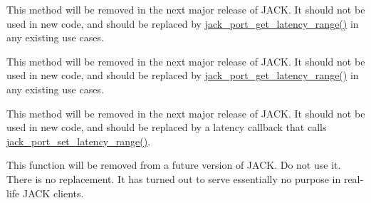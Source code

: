 \begin{DoxyRefList}
\item[\label{da/d58/deprecated__deprecated000009}%
\hypertarget{da/d58/deprecated__deprecated000009}{}%
\-Global \hyperlink{group__LatencyFunctions_ga47fa957309f9b3111010284e10cc1de0}{jack\-\_\-port\-\_\-get\-\_\-latency} (jack\-\_\-port\-\_\-t $\ast$port) \-J\-A\-C\-K\-\_\-\-O\-P\-T\-I\-O\-N\-A\-L\-\_\-\-W\-E\-A\-K\-\_\-\-D\-E\-P\-R\-E\-C\-A\-T\-E\-D\-\_\-\-E\-X\-P\-O\-R\-T]\-This method will be removed in the next major release of \-J\-A\-C\-K. \-It should not be used in new code, and should be replaced by \hyperlink{group__LatencyFunctions_gaf379bc0e88a6df6c4b7836db4b9382d7}{jack\-\_\-port\-\_\-get\-\_\-latency\-\_\-range()} in any existing use cases.  
\item[\label{da/d58/deprecated__deprecated000010}%
\hypertarget{da/d58/deprecated__deprecated000010}{}%
\-Global \hyperlink{group__LatencyFunctions_ga7f5835f17cb55a5ed64bb63cb18c462c}{jack\-\_\-port\-\_\-get\-\_\-total\-\_\-latency} (jack\-\_\-client\-\_\-t $\ast$, jack\-\_\-port\-\_\-t $\ast$port) \-J\-A\-C\-K\-\_\-\-O\-P\-T\-I\-O\-N\-A\-L\-\_\-\-W\-E\-A\-K\-\_\-\-D\-E\-P\-R\-E\-C\-A\-T\-E\-D\-\_\-\-E\-X\-P\-O\-R\-T]\-This method will be removed in the next major release of \-J\-A\-C\-K. \-It should not be used in new code, and should be replaced by \hyperlink{group__LatencyFunctions_gaf379bc0e88a6df6c4b7836db4b9382d7}{jack\-\_\-port\-\_\-get\-\_\-latency\-\_\-range()} in any existing use cases.  
\item[\label{da/d58/deprecated__deprecated000008}%
\hypertarget{da/d58/deprecated__deprecated000008}{}%
\-Global \hyperlink{group__LatencyFunctions_gaba121996f00bd96ceec5b1c1012fc767}{jack\-\_\-port\-\_\-set\-\_\-latency} (jack\-\_\-port\-\_\-t $\ast$, jack\-\_\-nframes\-\_\-t) \-J\-A\-C\-K\-\_\-\-O\-P\-T\-I\-O\-N\-A\-L\-\_\-\-W\-E\-A\-K\-\_\-\-D\-E\-P\-R\-E\-C\-A\-T\-E\-D\-\_\-\-E\-X\-P\-O\-R\-T]\-This method will be removed in the next major release of \-J\-A\-C\-K. \-It should not be used in new code, and should be replaced by a latency callback that calls \hyperlink{group__LatencyFunctions_ga7a8f181fcec32945db7b8e06ee1ca94b}{jack\-\_\-port\-\_\-set\-\_\-latency\-\_\-range()}.  
\item[\label{da/d58/deprecated__deprecated000006}%
\hypertarget{da/d58/deprecated__deprecated000006}{}%
\-Global \hyperlink{group__PortFunctions_ga14afcad849c17bcd6cb739d14899cecf}{jack\-\_\-port\-\_\-tie} (jack\-\_\-port\-\_\-t $\ast$src, jack\-\_\-port\-\_\-t $\ast$dst) \-J\-A\-C\-K\-\_\-\-O\-P\-T\-I\-O\-N\-A\-L\-\_\-\-W\-E\-A\-K\-\_\-\-D\-E\-P\-R\-E\-C\-A\-T\-E\-D\-\_\-\-E\-X\-P\-O\-R\-T]\-This function will be removed from a future version of \-J\-A\-C\-K. \-Do not use it. \-There is no replacement. \-It has turned out to serve essentially no purpose in real-\/life \-J\-A\-C\-K clients.  

\end{DoxyRefList}
